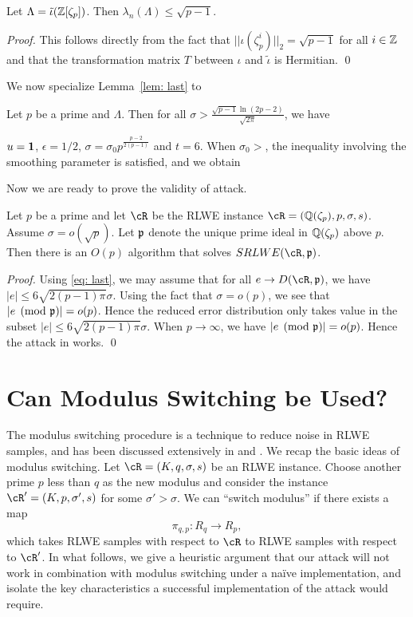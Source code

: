\documentclass[envcountsame]{llncs}
\begin{document}
\begin{lemma}
Let $\Lambda = \tilde{\iota}(\mathbb{Z}[\zeta_p])$. Then $\lambda_n(\Lambda) \leq \sqrt{p-1}$.
\end{lemma}

\begin{proof}
This follows directly from the fact that $||\iota(\zeta_p^i)||_2 = \sqrt{p-1}$ for all $i \in \mathbb{Z}$ and that the transformation matrix $T$ between $\iota$ and $\tilde{\iota}$ is Hermitian.
\qed \end{proof}


We now specialize Lemma~\ref{lem: last} to

\begin{proposition}
Let $p$ be a prime and $\Lambda$. Then for all $\sigma > \frac{\sqrt{p-1} \ln(2p-2)}{\sqrt{2 \pi}}$, we have
\end{proposition}
$u = {\bf 1}$, $\epsilon = 1/2$, $\sigma = \sigma_0 p^{\frac{p-2}{2(p-1)}}$ and $t = 6$. When $\sigma_0 > $, the inequality involving the smoothing parameter is satisfied, and we obtain

Now we are ready to prove the validity of attack.
\begin{theorem}
Let $p$ be a prime and let $\cR$ be the RLWE instance $\cR = (\bQ(\zeta_p), p, \sigma,s)$.
Assume $\sigma = o(\sqrt{p})$. Let $\mathfrak{p}$ denote the unique prime ideal in $\mathbb{Q}(\zeta_p)$ above $p$. Then there is an $O(p)$ algorithm that solves $SRLWE(\cR,\fp)$.
\end{theorem}

\begin{proof}
Using \ref{eq: last}, we may assume that for all $e \to D(\cR,\fp)$, we have $|e|\leq 6\sqrt{2(p-1)\pi} \sigma$. Using the fact that $\sigma = o(p)$, we see that $|e \pmod{\mathfrak{p}}| = o(p)$. Hence the reduced error distribution only takes value in the subset
$|e|\leq 6\sqrt{2(p-1)\pi} \sigma$. When $p \to \infty$, we have $|e \pmod {\mathfrak{p}}| = o(p)$.  Hence the attack in \cite{elos2015weak} works.
\qed \end{proof}
\fi

\section{Can Modulus Switching be Used?}
\label{sec:mod}

The modulus switching procedure is a technique to reduce noise
in RLWE samples, and has been discussed extensively in  \cite{brakerski2012leveled} and \cite{langlois2014worst}.
We recap the basic ideas of modulus switching. Let $\cR = (K, q, \sigma, s)$ be an RLWE instance. Choose another prime $p$ less than $q$ as the new modulus and consider the instance $\cR' = (K,p,\sigma',s)$ for some $\sigma' > \sigma$.  We can ``switch modulus'' if there exists a map
\[
\pi_{q,p} : R_q \to R_p,
\]
which takes RLWE samples with respect to $\cR$ to RLWE samples with respect to $\cR'$.  In what follows, we give a heuristic argument that our attack will not work in combination with modulus switching under a na\"ive implementation, and isolate the key characteristics a successful implementation of the attack would require.
\end{document}
